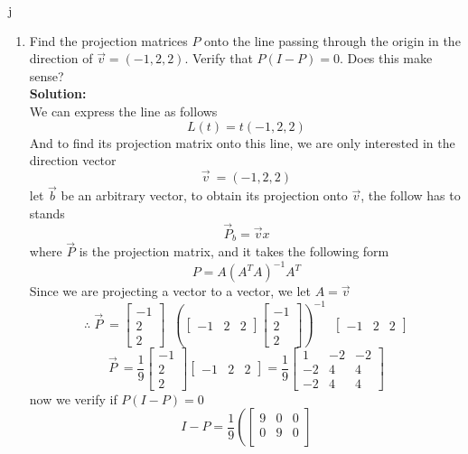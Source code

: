 j\documentclass[12pt]{article}
\begin{document}
\begin{enumerate}
    \item Find the projection matrices $P$ onto the line passing through the origin in the direction of $\vec v = (-1, 2, 2)$.  Verify that $P(I - P) = 0$.  Does this make sense?   
    \\
    \textbf{Solution:}\\
    We can express the line as follows
    \[
    L(t)=t(-1,2,2)
    \]
    And to find its projection matrix onto this line, we are only interested in the direction vector
    \[
    \vec v\ = (-1,2,2)
    \]
    let $\vec b$ be an arbitrary vector, to obtain its projection onto $\vec v$, the follow has to stands
    \[
    \vec{P}_b = \vec{v}x
    \]
    where $\vec P$ is the projection matrix, and it takes the following form
    \[
    P=A(A^TA)^{-1}A^T
    \]
    Since we are projecting a vector to a vector, we let $A=\vec v$
    \[
    \therefore \; \vec P\ = 
    \begin{bmatrix}
       -1\\2\\2 
    \end{bmatrix}
    \;\;
    \left(
    \begin{bmatrix}
        -1&2&2
    \end{bmatrix}
    \begin{bmatrix}
       -1\\2\\2 
    \end{bmatrix}
    \right)^{-1}
    \;\;
    \begin{bmatrix}
        -1&2&2
    \end{bmatrix}
    \]
    \[
    \vec P\ = 
    \frac{1}{9}
    \begin{bmatrix}
       -1\\2\\2 
    \end{bmatrix}
    \begin{bmatrix}
        -1&2&2
    \end{bmatrix}
    =
    \frac{1}{9}
    \begin{bmatrix}
        1&-2&-2\\
        -2&4&4\\
        -2&4&4
    \end{bmatrix}
    \]
    now we verify if $P(I-P)=0$
    \[
    I-P=\frac{1}{9}
    \left(
    \begin{bmatrix}
        9&0&0\\
        0&9&0\\

\end{bmatrix}\]
\end{enumerate}
\end{document}
